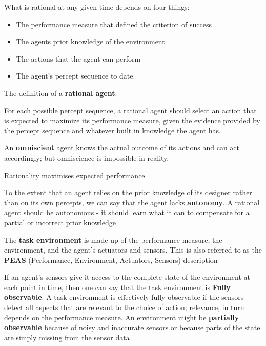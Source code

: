 \documentclass{article}
\begin{document}
What is rational at any given time depends on four things:

\begin{itemize}
    \item The performance measure that defined the criterion of success
    \item The agents prior knowledge of the environment
    \item The actions that the agent can perform
    \item The agent's percept sequence to date.

\end{itemize}

The definition of a \textbf{rational agent}:

For each possible percept sequence, a rational agent should select an action that is expected to maximize its performance measure, given the evidence provided by the percept sequence and whatever built in knowledge the agent has. \newline

An \textbf{omniscient} agent knows the actual outcome of its actions and can act accordingly; but omniscience is impossible in reality.

Rationality maximises expected performance

To the extent that an agent relies on the prior knowledge of its designer rather than on its own percepts, we can say that the agent lacks \textbf{autonomy}. A rational agent should be autonomous - it should learn what it can to compensate for a partial or incorrect prior knowledge

The \textbf{task environment} is made up of  the performance measure, the environment, and the agent's actuators and sensors. This is also referred to as the \textbf{PEAS} (Performance, Environment, Actuators, Sensors) description \newline

If an agent's sensors give it access to the complete state of the environment at each point in time, then one can say that the task environment is \textbf{Fully observable}. A task environment is effectively fully observable if the sensors detect all aspects that are relevant to the choice of action; relevance, in turn depends on the performance measure. An environment might be \textbf{partially observable} because of noisy and inaccurate sensors or because parts of the state are simply missing from the sensor data \newline
\end{document}

